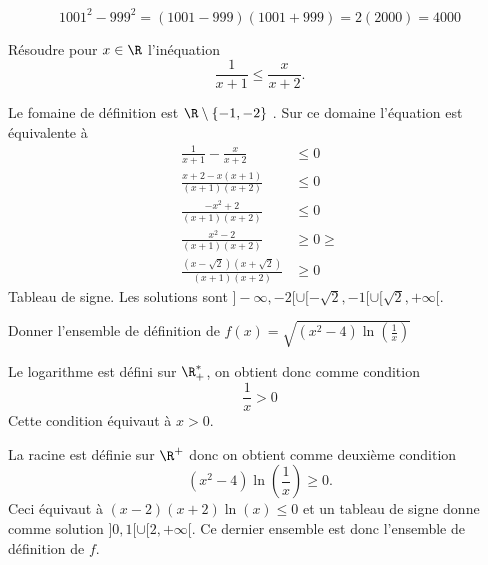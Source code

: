 \documentclass[a4paper, 11pt,reqno]{article}
\begin{document}
\begin{correction}
$$1001^2-999^2 =  (1001-999)(1001+999) = 2 (2000)=4000$$
\end{correction}





\begin{exercice}
Résoudre pour $x \in \R$ l'inéquation $$\frac{1}{x+1}\leq \frac{x}{x+2}.$$
\end{exercice}



\begin{correction}
Le fomaine de définition est $\R\setminus\{ -1, -2\}$ . Sur ce domaine l'équation est équivalente à 
\begin{align*}
\frac{1}{x+1}-\frac{x}{x+2}&\leq 0\\
\frac{x+2-x(x+1)}{(x+1)(x+2)}&\leq 0\\
\frac{-x^2+2}{(x+1)(x+2)}&\leq 0\\
\frac{x^2-2}{(x+1)(x+2)}&\geq 0\geq\\
\frac{(x-\sqrt{2})(x+\sqrt{2})}{(x+1)(x+2)}&\geq 0
\end{align*}
Tableau de signe. 
Les solutions sont $]-\infty, -2[\cup [-\sqrt{2}, -1[\cup [\sqrt{2}, +\infty[$. 

\end{correction}



\begin{exercice}
Donner l'ensemble de définition de $f(x) = \sqrt{ (x^2-4)\ln\left(\frac{1}{x}\right)}$
\end{exercice}


\begin{correction}


Le logarithme est défini sur $\R^*_+$, on obtient donc comme condition 
$$\frac{1}{x}>0$$
Cette  condition équivaut à $x>0$.

La racine est définie sur $\R^+$ donc on obtient comme deuxième condition 
$$(x^2-4)\ln(\frac{1}{x}) \geq 0.$$
Ceci équivaut à $(x-2)(x+2) \ln(x)\leq 0$ et un tableau de signe donne comme solution $]0,1[\cup [2,+\infty[$.
Ce dernier ensemble est donc l'ensemble de définition de $f$. 





\end{correction}
\end{document}
